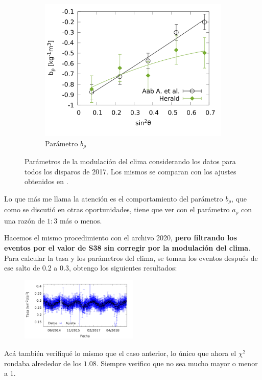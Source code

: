 \begin{figure}[H]
					\begin{subfigure}[b]{\textwidth}
					\centering
					\includegraphics[width=0.5\linewidth]{params/brho_2017_above_1EeV.png}
					\caption{Parámetro  $b_\rho$	 }
					\label{fig:brho_2017_1EeV}
					\end{subfigure}%
					\caption{Parámetros de la modulación del clima considerando los datos para todos los disparos de 2017. Los mismos se comparan con los ajustes obtenidos en \cite{aab2017impact}.}\label{fig:parameters_2017_1EeV}
				\end{figure}

				Lo que más me llama la atención es el comportamiento del parámetro $b_\rho$, que como se discutió en otras oportunidades, tiene que ver con el parámetro $a_\rho$ con una razón de  $1:3$ más o menos. 



			Hacemos el mismo procedimiento con el archivo 2020, {\bf pero filtrando los eventos por el valor de S38 sin corregir por la modulación del clima}. Para calcular la tasa y los parámetros del clima, se toman los eventos después de ese salto de 0.2 a 0.3, obtengo los siguientes resultados:

				\begin{figure}[H]
					\centering
					\includegraphics[width=0.5\textwidth]{daily_rate/daily_rate_AllTriggers_2020_1EeV.png}
				\end{figure}

			Acá también verifiqué lo mismo que el caso anterior, lo único que ahora el $\chi^2$ rondaba alrededor de los $1.08$. Siempre verifico que no sea mucho mayor o menor a 1.

